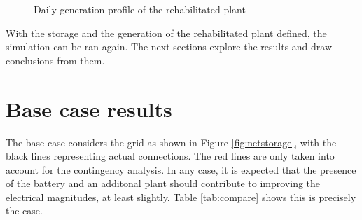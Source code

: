 \begin{figure}[!htb]\centering
{}
\caption{Daily generation profile of the rehabilitated plant}
    \label{fig:dism}
  \end{figure}

With the storage and the generation of the rehabilitated plant defined, the simulation can be ran again. The next sections explore the results and draw conclusions from them.


\section{Base case results}
The base case considers the grid as shown in Figure \ref{fig:netstorage}, with the black lines representing actual connections. The red lines are only taken into account for the contingency analysis. In any case, it is expected that the presence of the battery and an additonal plant should contribute to improving the electrical magnitudes, at least slightly. Table \ref{tab:compare} shows this is precisely the case.


